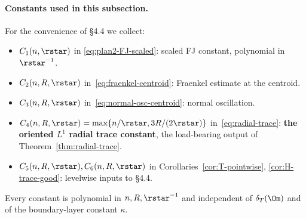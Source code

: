 \paragraph*{Constants used in this subsection.} For the convenience of
\S4.4 we collect:
\begin{itemize}
\item $C_1(n,\rstar)$ in \eqref{eq:plan2-FJ-scaled}: scaled FJ constant,
polynomial in $\rstar^{-1}$.
\item $C_2(n,R,\rstar)$ in~\eqref{eq:fraenkel-centroid}: Fraenkel
estimate at the centroid.
\item $C_3(n,R,\rstar)$ in~\eqref{eq:normal-osc-centroid}: normal
oscillation.
\item $C_4(n,R,\rstar)=\max\{n/\rstar,3R/(2\rstar)\}$ in~\eqref{eq:radial-trace}:
\textbf{the oriented $L^1$ radial trace constant}, the load-bearing
output of Theorem~\ref{thm:radial-trace}.
\item $C_5(n,R,\rstar),C_6(n,R,\rstar)$ in Corollaries~\ref{cor:T-pointwise},
\ref{cor:H-trace-good}: levelwise inputs to \S4.4.
\end{itemize}
Every constant is polynomial in $n,R,\rstar^{-1}$ and independent of
$\delta_T(\Om)$ and of the boundary-layer constant $\kappa$.

